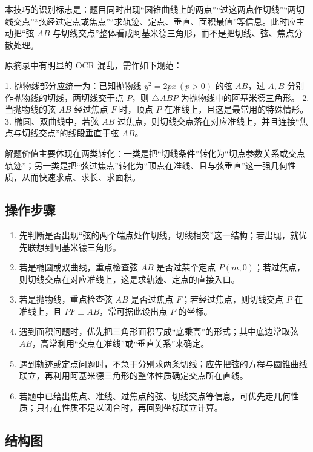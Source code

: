 \documentclass[UTF8,a4paper,11pt]{ctexart}
\begin{document}
本技巧的识别标志是：题目同时出现“圆锥曲线上的两点”“过这两点作切线”“两切线交点”“弦经过定点或焦点”“求轨迹、定点、垂直、面积最值”等信息。此时应主动把“弦 $AB$ 与切线交点”整体看成阿基米德三角形，而不是把切线、弦、焦点分散处理。

原摘录中有明显的 OCR 混乱，需作如下规范：

1. 抛物线部分应统一为：已知抛物线 $y^2=2px\,(p>0)$ 的弦 $AB$，过 $A,B$ 分别作抛物线的切线，两切线交于点 $P$，则 $\triangle ABP$ 为抛物线中的阿基米德三角形。
2. 当抛物线的弦 $AB$ 经过焦点 $F$ 时，顶点 $P$ 在准线上，且这是最常用的特殊情形。
3. 椭圆、双曲线中，若弦 $AB$ 过焦点，则切线交点落在对应准线上，并且连接“焦点与切线交点”的线段垂直于弦 $AB$。

解题价值主要体现在两类转化：一类是把“切线条件”转化为“切点参数关系或交点轨迹”；另一类是把“弦过焦点”转化为“顶点在准线、且与弦垂直”这一强几何性质，从而快速求点、求长、求面积。

\subsection*{操作步骤}

\begin{enumerate}

\item 先判断是否出现“弦的两个端点处作切线，切线相交”这一结构；若出现，就优先联想到阿基米德三角形。

\item 若是椭圆或双曲线，重点检查弦 $AB$ 是否过某个定点 $P(m,0)$；若过焦点，则切线交点在对应准线上，这是求轨迹、定点的直接入口。

\item 若是抛物线，重点检查弦 $AB$ 是否过焦点 $F$；若经过焦点，则切线交点 $P$ 在准线上，且 $PF\perp AB$，常可据此设出点 $P$ 的坐标。

\item 遇到面积问题时，优先把三角形面积写成“底乘高”的形式；其中底边常取弦 $AB$，高常利用“交点在准线”或“垂直关系”来确定。

\item 遇到轨迹或定点问题时，不急于分别求两条切线；应先把弦的方程与圆锥曲线联立，再利用阿基米德三角形的整体性质确定交点所在直线。

\item 若题中已给出焦点、准线、过焦点的弦、切线交点等信息，可优先走几何性质；只有在性质不足以闭合时，再回到坐标联立计算。

\end{enumerate}

\subsection*{结构图}
\end{document}
